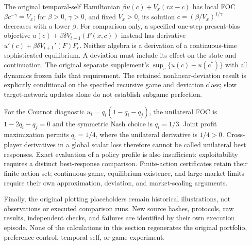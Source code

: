 The original temporal-self Hamiltonian $\beta u(c)+V_x(r x-c)$ has local
FOC $\beta c^{-\gamma}=V_x$; for $\beta>0$, $\gamma>0$, and fixed $V_x>0$,
its solution $c=(\beta/V_x)^{1/\gamma}$ decreases with a lower $\beta$.
For comparison only, a specified one-step present-bias
objective $u(c)+\beta\delta V_{t+1}(F(x,c))$ instead has derivative
$u'(c)+\beta\delta V_{t+1}'(F)F_c$.  Neither algebra is a derivation of a
continuous-time sophisticated equilibrium.  A deviation must include its
effect on the state and continuation.  The original separate supplement's
$\sup_c\{u(c)-u(c^*)\}$ with all dynamics frozen fails that requirement.
The retained nonlinear-deviation result is explicitly conditional on the
specified recursive game and deviation class; slow target-network updates
alone do not establish subgame perfection.

For the Cournot diagnostic $u_i=q_i(1-q_i-q_j)$, the unilateral FOC is
$1-2q_i-q_j=0$ and the symmetric Nash choice is $q_i=1/3$.
Joint profit maximization permits $q_i=1/4$, where the unilateral derivative
is $1/4>0$.  Cross-player derivatives in a global scalar loss therefore
cannot be called unilateral best responses.  Exact evaluation of a policy
profile is also insufficient: exploitability requires a distinct best-response
comparison.  Finite-action certificates retain their finite action set;
continuous-game, equilibrium-existence, and large-market limits require
their own approximation, deviation, and market-scaling arguments.

Finally, the original plotting placeholders remain historical illustrations,
not observations or executed comparison runs.  New source hashes, protocols,
raw results, independent checks, and failures are identified by their own
execution episode.  None of the calculations in this section regenerates the
original portfolio, preference-control, temporal-self, or game experiment.
